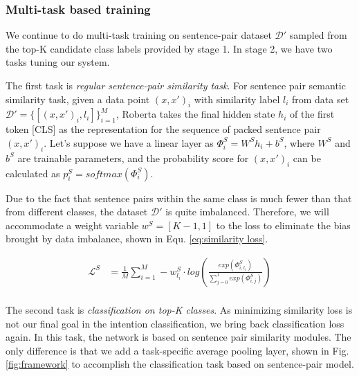 \documentclass[letterpaper]{article} %
\begin{document}
  \subsubsection*{Multi-task based training}
  We   continue  to  do  multi-task  training  on  sentence-pair  dataset
  $\mathcal{D'}$ sampled from the top-K candidate class labels provided by stage
  1. In stage 2, we have two tasks tuning our system.

  The first task is \emph{regular sentence-pair similarity task}.
  For  sentence  pair semantic similarity task, given a data point $(x, x')_{i}$
  with       similarity       label       $l_{i}$       from       data      set
  $\mathcal{D'}=\{[(x,x')_{i},l_{i}]\}_{i=1}^{M}$,   Roberta   takes  the  final
  hidden  state  $h_{i}$  of the first token [CLS] as the representation for the
  sequence of packed sentence pair $(x, x')_{i}$. Let's suppose we have a linear
  layer  as  ${\Phi}^S_{i}=W^Sh_{i}+b^S$,  where  $W^S$  and $b^S$ are trainable
  parameters,  and  the probability score for $(x, x')_{i}$ can be calculated as
  $p^S_{i}=softmax({\Phi}^S_{i})$.

  Due  to  the  fact that sentence pairs within the same class is much fewer than
  that from  different  classes,  the  dataset  $\mathcal{D'}$  is
  quite imbalanced.  Therefore, we will accommodate a weight variable $w^S = [K-1, 1]$
  to  the  loss  to eliminate the bias brought by data imbalance, shown in Equ.
  \ref{eq:similarity loss}.

  \begin{equation}
    \begin{aligned}
      \mathcal{L}^{S}&=\frac{1}{M}\sum_{i=1}^{M}-w^S_{l_i}\cdot log(\frac{exp(\varPhi_{i,l_{i}}^S)}{\sum_{j=0}^{1}exp(\varPhi_{i,j}^S)}) \\
      \label{eq:similarity loss}
    \end{aligned}
  \end{equation}

  The  second  task  is  \emph{classification  on  top-K classes}. As minimizing
  similarity  loss  is  not  our  final goal in the intention classification, we
  bring  back  classification  loss again. In this task, the network is based on
  sentence  pair  similarity  modules.  The  only  difference  is  that we add a
  task-specific  average  pooling  layer,  shown  in Fig. \ref{fig:framework} to
  accomplish the classification task based on sentence-pair model.
\end{document}
